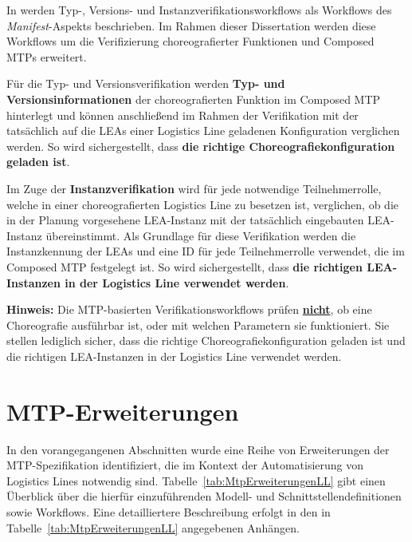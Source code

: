 In \cite{PNO.2025.Part1} werden Typ-, Versions- und Instanzverifikationsworkflows als Workflows des \emph{Manifest}-Aspekts beschrieben. Im Rahmen dieser Dissertation werden diese Workflows um die Verifizierung choreografierter Funktionen und Composed MTPs erweitert. 

Für die Typ- und Versionsverifikation werden \textbf{Typ- und Versionsinformationen} der choreografierten Funktion im Composed MTP hinterlegt und können anschließend im Rahmen der Verifikation mit der tatsächlich auf die LEAs einer Logistics Line geladenen Konfiguration verglichen werden. So wird sichergestellt, dass \textbf{die richtige Choreografiekonfiguration geladen ist}.

Im Zuge der \textbf{Instanzverifikation} wird für jede notwendige Teilnehmerrolle, welche in einer choreografierten Logistics Line zu besetzen ist, verglichen, ob die in der Planung vorgesehene LEA-Instanz mit der tatsächlich eingebauten LEA-Instanz übereinstimmt. Als Grundlage für diese Verifikation werden die Instanzkennung der LEAs und eine ID für jede Teilnehmerrolle verwendet, die im Composed MTP festgelegt ist. So wird sichergestellt, dass \textbf{die richtigen LEA-Instanzen in der Logistics Line verwendet werden}.

\begin{graybox}
	\textbf{Hinweis:} Die MTP-basierten Verifikationsworkflows prüfen \underline{\textbf{nicht}}, ob eine Choreografie ausführbar ist, oder mit welchen Parametern sie funktioniert. Sie stellen lediglich sicher, dass die richtige Choreografiekonfiguration geladen ist und die richtigen LEA-Instanzen in der Logistics Line verwendet werden.
\end{graybox}

 
\section{MTP-Erweiterungen}
\label{sec:MTPErweiterungenLL}

In den vorangegangenen Abschnitten wurde eine Reihe von Erweiterungen der MTP-Spezifikation identifiziert, die im Kontext der Automatisierung von Logistics Lines notwendig sind. Tabelle~\ref{tab:MtpErweiterungenLL} gibt einen Überblick über die hierfür einzuführenden Modell- und Schnittstellendefinitionen sowie Workflows. Eine detailliertere Beschreibung erfolgt in den in Tabelle~\ref{tab:MtpErweiterungenLL} angegebenen Anhängen.

